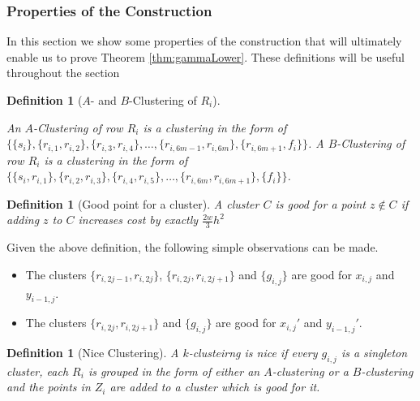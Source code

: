 \documentclass{article}
\newtheorem{definition}[theorem]{Definition}
\begin{document}
\subsubsection{Properties of the Construction}

In this section we show some properties of the construction that will ultimately enable us to prove Theorem \ref{thm:gammaLower}. These definitions will be useful throughout the section

\begin{definition}[$A$- and $B$-Clustering of $R_i$]
\label{defn:abclusteringVattani}

An $A$-Clustering of row $R_i$ is a clustering in the form of $\{\{s_i\}, \{r_{i,1}, r_{i,2}\}, \{r_{i,3}, r_{i,4}\}, \ldots, \{r_{i,6m-1}, r_{i,6m}\},\{r_{i, 6m+1}, f_i\}\}$. A $B$-Clustering of row $R_i$ is a clustering in the form of $\{\{s_i, r_{i, 1}\}, \{r_{i,2}, r_{i,3}\}, \{r_{i,4}, r_{i,5}\}, \ldots, \{r_{i,6m}, r_{i,6m+1}\},\{f_i\}\}$. 
\end{definition}

\begin{definition}[Good point for a cluster]
\label{defn:goodPointVattani}
A cluster $C$ is good for a point $z \not\in C$ if adding $z$ to $C$ increases cost by exactly $\frac{2w}{3}h^2$ 
\end{definition}

Given the above definition, the following simple observations can be made. 
\begin{itemize}[nolistsep,noitemsep]
\item The clusters $\{r_{i,2j-1}, r_{i, 2j}\}$, $\{r_{i,2j}, r_{i, 2j+1}\}$ and $\{g_{i,j}\}$ are good for $x_{i,j}$ and $y_{i-1,j}$.
\item The clusters $\{r_{i,2j}, r_{i, 2j+1}\}$ and $\{g_{i,j}\}$ are good for $x_{i,j}'$ and $y_{i-1,j}'$.
\end{itemize}

\begin{definition}[Nice Clustering]
\label{defn:niceClustering}
A $k$-clusteirng is nice if every $g_{i,j}$ is a singleton cluster, each $R_i$ is grouped in the form of either an $A$-clustering or a $B$-clustering and the points in $Z_i$ are added to a cluster which is good for it.
\end{definition}
\end{document}
